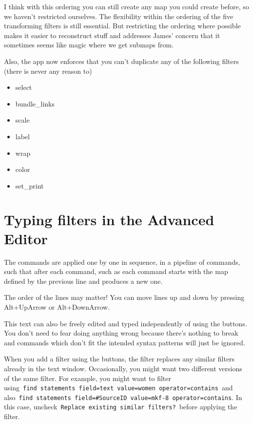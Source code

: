 \documentclass[
]{book}
\providecommand{\tightlist}{%
  \setlength{\itemsep}{0pt}\setlength{\parskip}{0pt}}
\begin{document}
I think with this ordering you can still create any map you could create before, so we haven't restricted ourselves. The flexibility within the ordering of the five transforming filters is still essential. But restricting the ordering where possible makes it easier to reconstruct stuff and addresses James' concern that it sometimes seems like magic where we get submaps from.

Also, the app now enforces that you can't duplicate any of the following filters (there is never any reason to)

\begin{itemize}
\tightlist
\item
  select
\item
  bundle\_links
\item
  scale
\item
  label
\item
  wrap
\item
  color
\item
  set\_print
\end{itemize}

\hypertarget{typing-filters-in-the-advanced-editor}{%
\chapter{Typing filters in the Advanced Editor}\label{typing-filters-in-the-advanced-editor}}

The commands are applied one by one in sequence, in a pipeline of commands, such that after each command, such as each command starts with the map defined by the previous line and produces a new one.

The order of the lines may matter! You can move lines up and down by pressing Alt+UpArrow or Alt+DownArrow.

This text can also be freely edited and typed independently of using the buttons. You don't need to fear doing anything wrong because there's nothing to break and commands which don't fit the intended syntax patterns will just be ignored.

When you add a filter using the buttons, the filter replaces any similar filters already in the text window. Occasionally, you might want two different versions of the same filter. For example, you might want to filter using~\texttt{find\ statements\ field=text\ value=women\ operator=contains}~and also~\texttt{find\ statements\ field=\#SourceID\ value=mkf-8\ operator=contains}. In this case, uncheck~\texttt{Replace\ existing\ similar\ filters?}~before applying the filter.
\end{document}
